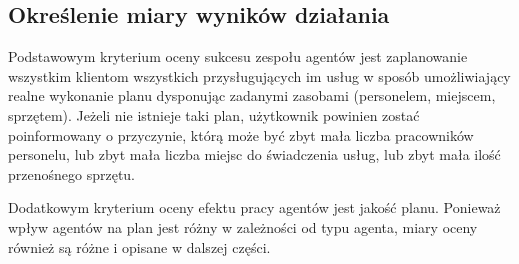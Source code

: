 %
%

\subsection{Określenie miary wyników działania}\label{ssec:miaraWynikow}
Podstawowym kryterium oceny sukcesu zespołu agentów jest zaplanowanie wszystkim klientom
wszystkich przysługujących im usług w sposób umożliwiający realne wykonanie planu
dysponując zadanymi zasobami (personelem, miejscem, sprzętem).
Jeżeli nie istnieje taki plan, użytkownik powinien zostać poinformowany o przyczynie,
którą może być zbyt mała liczba pracowników personelu, lub zbyt mała liczba miejsc
do świadczenia usług, lub zbyt mała ilość przenośnego sprzętu.

Dodatkowym kryterium oceny efektu pracy agentów jest jakość planu. Ponieważ wpływ agentów na plan
jest różny w zależności od typu agenta, miary oceny również są różne i opisane w dalszej części.

